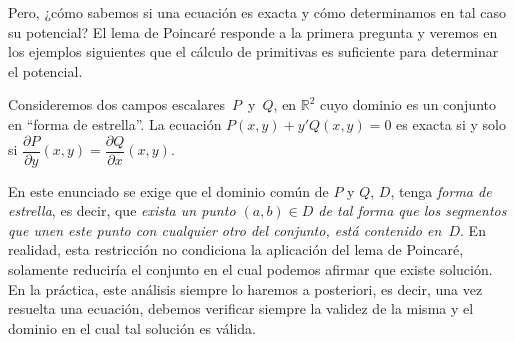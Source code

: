 Pero, ¿cómo sabemos si una ecuación es exacta y cómo determinamos en tal caso su potencial?
El lema de Poincaré responde a la primera pregunta y veremos en los ejemplos siguientes que el cálculo de primitivas es suficiente para determinar el potencial.
%
\begin{teorema}
Consideremos dos campos escalares~$P$~y~$Q$, en $\mathbb{R}^2$ cuyo dominio es un conjunto en ``forma de estrella''.
La ecuación $P(x,y)+y'Q(x,y)=0$ es exacta si y solo si
$\dfrac{\partial P}{\partial y}(x,y)=\dfrac{\partial Q}{\partial x}(x,y)$.
\end{teorema}

En este enunciado se exige que el dominio común de $P$ y $Q$, $\mathit D$, tenga \emph{forma de estrella}, es decir, que \emph{exista un punto $(a,b)\in \mathit D$ de tal forma que los segmentos que unen este punto con cualquier otro del conjunto, está contenido en~$\mathit D$}.
En realidad, esta restricción no condiciona la aplicación del lema de Poincaré, solamente reduciría el conjunto en el cual podemos afirmar que existe solución.
En la práctica, este análisis siempre lo haremos a posteriori, es decir, una vez resuelta una ecuación, debemos verificar siempre la validez de la misma y el dominio en el cual tal solución es válida.

